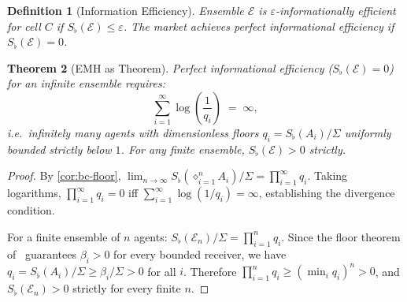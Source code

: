 \documentclass[twocolumn,11pt,a4paper]{article}
\newtheorem{theorem}{Theorem}[section]
\newtheorem{definition}[theorem]{Definition}
\theoremstyle{remark}
\newcommand{\Sflat}{S_{\flat}}
\newcommand{\Compose}{\diamond}           %
\newcommand{\Ens}{\mathcal{E}}            %
\begin{document}
\begin{definition}[Information Efficiency]
\label{def:info-efficiency}
Ensemble $\Ens$ is \emph{$\varepsilon$-informationally efficient} for cell
$C$ if $\Sflat(\Ens) \le \varepsilon$.  The market achieves
\emph{perfect informational efficiency} if $\Sflat(\Ens) = 0$.
\end{definition}

\begin{theorem}[EMH as Theorem]
\label{thm:emh}
Perfect informational efficiency ($\Sflat(\Ens) = 0$) for an infinite
ensemble requires:
\[
  \sum_{i=1}^\infty \log\!\left(\frac{1}{q_i}\right) \;=\; \infty,
\]
i.e.\ infinitely many agents with dimensionless floors $q_i =
\Sflat(A_i)/\Sigma$ uniformly bounded strictly below $1$.  For any finite
ensemble, $\Sflat(\Ens) > 0$ strictly.
\end{theorem}
\begin{proof}
By \cref{cor:bc-floor}, $\lim_{n\to\infty} \Sflat(\Compose_{i=1}^n A_i)/\Sigma
= \prod_{i=1}^\infty q_i$.  Taking logarithms, $\prod_{i=1}^\infty q_i = 0$
iff $\sum_{i=1}^\infty \log(1/q_i) = \infty$, establishing the divergence
condition.

For a finite ensemble of $n$ agents: $\Sflat(\Ens_n)/\Sigma = \prod_{i=1}^n
q_i$.  Since the floor theorem of~\cite{sachikonye2025agents} guarantees
$\beta_i > 0$ for every bounded receiver, we have $q_i = \Sflat(A_i)/\Sigma
\ge \beta_i/\Sigma > 0$ for all $i$.  Therefore $\prod_{i=1}^n q_i \ge
(\min_i q_i)^n > 0$, and $\Sflat(\Ens_n) > 0$ strictly for every finite $n$.
\end{proof}
\end{document}

